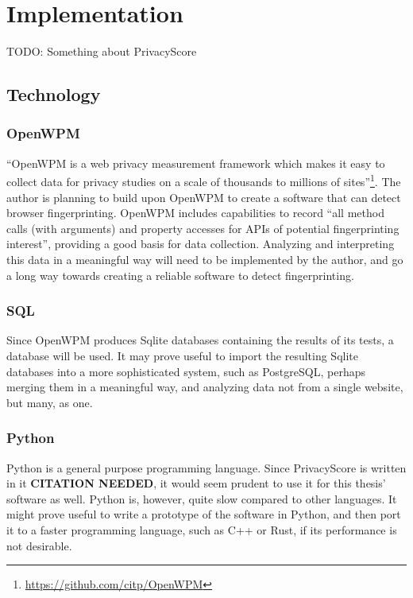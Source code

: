 \documentclass[
    fontsize=12pt,
    headings=small,
    parskip=half,
    bibliography=totoc,
    numbers=noenddot,
    open=any
    ]{scrreprt}
\begin{document}

\begingroup
\renewcommand{\cleardoublepage}{}
\renewcommand{\clearpage}{}
\chapter{Implementation} %
\endgroup
TODO: Something about PrivacyScore

\section{Technology}

\subsection{OpenWPM}
``OpenWPM is a web privacy measurement framework which makes it easy to collect data for privacy studies on a scale
of thousands to millions of sites''\footnote{\url{https://github.com/citp/OpenWPM}}.
The author is planning to build upon OpenWPM \cite{DBLP:conf/ccs/EnglehardtN16} to create a software that can detect
browser fingerprinting. OpenWPM includes capabilities to record
``all method calls (with arguments) and property accesses for APIs of potential fingerprinting interest'',
providing a good basis for data collection. Analyzing and interpreting this data in a meaningful way
will need to be implemented by the author, and go a long way towards creating a reliable software
to detect fingerprinting.

\subsection{SQL}
Since OpenWPM produces Sqlite databases containing the results of its tests, a database will be used. It may prove useful
to import the resulting Sqlite databases into a more sophisticated system, such as PostgreSQL, perhaps merging them in a
meaningful way, and analyzing data not from a single website, but many, as one.

\subsection{Python}
Python is a general purpose programming language. Since PrivacyScore is written in it \textbf{CITATION NEEDED},
it would seem prudent to use it for this thesis' software as well.
Python is, however, quite slow compared to other languages. It might prove useful to write a prototype of the software in Python,
and then port it to a faster programming language, such as C++ or Rust, if its performance is not desirable.
\end{document}
